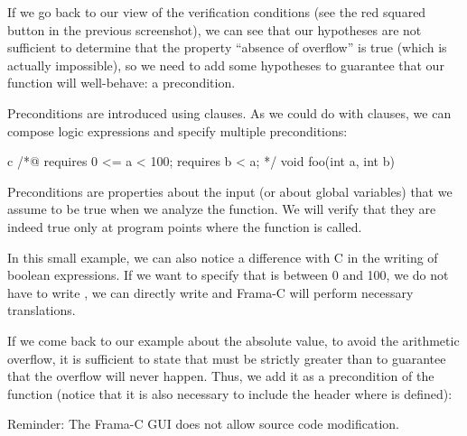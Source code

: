 If we go back to our view of the verification conditions (see the red squared
button in the previous screenshot), we can see that our hypotheses are not
sufficient to determine that the property ``absence of overflow'' is true (which
is actually impossible), so we need to add some hypotheses to
guarantee that our function will well-behave: a precondition.






Preconditions are introduced using  clauses. As we
could do with  clauses, we can compose logic expressions
and specify multiple preconditions:



\begin{CodeBlock}{c}
/*@
  requires 0 <= a < 100;
  requires b < a;
*/
void foo(int a, int b){

}
\end{CodeBlock}



Preconditions are properties about the input (or about
global variables) that we assume to be true when we analyze the
function. We will verify that they are indeed true only at program
points where the function is called.



In this small example, we can also notice a difference with C in the
writing of boolean expressions. If we want to specify that  is
between 0 and 100, we do not have to write ,
we can directly write  and Frama-C will
perform necessary translations.



If we come back to our example about the absolute value, to avoid the
arithmetic overflow, it is sufficient to state that  must
be strictly greater than  to guarantee that the
overflow will never happen. Thus, we add it as a precondition of the
function (notice that it is also necessary to include the header where
 is defined):






\begin{Warning}
  Reminder: The Frama-C GUI does not allow source code modification.
\end{Warning}


